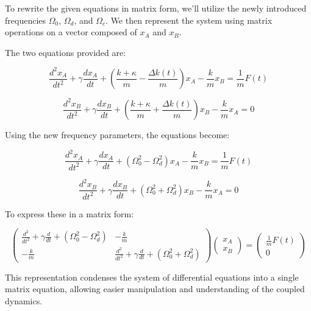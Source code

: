 \begin{airesult}
To rewrite the given equations in matrix form, we'll utilize the newly introduced frequencies
\(\Omega_0\), \(\Omega_d\), and \(\Omega_c\). We then represent the system using matrix operations
on a vector composed of \(x_A\) and \(x_B\).

The two equations provided are:

\vsp

\[
\frac{d^2x_A}{dt^2} + \gamma\frac{dx_A}{dt} + \left( \frac{k + \kappa}{m} - \frac{\Delta k(t)}{m}
\right)x_A
- \frac{k}{m}x_B = \frac{1}{m}F(t)
\]

\[
\frac{d^2x_B}{dt^2} + \gamma\frac{dx_B}{dt} + \left( \frac{k + \kappa}{m} + \frac{\Delta k(t)}{m}
\right)x_B
- \frac{k}{m}x_A = 0
\]

\vsp

Using the new frequency parameters, the equations become:

\vsp

\[
\frac{d^2x_A}{dt^2} + \gamma\frac{dx_A}{dt} + \left( \Omega_0^2 - \Omega_d^2 \right)x_A
- \frac{k}{m}x_B = \frac{1}{m}F(t)
\]

\[
\frac{d^2x_B}{dt^2} + \gamma\frac{dx_B}{dt} + \left( \Omega_0^2 + \Omega_d^2 \right)x_B
- \frac{k}{m}x_A = 0
\]

\vsp

To express these in a matrix form:

\[
\begin{pmatrix}
 \frac{d^2}{dt^2} + \gamma \frac{d}{dt} + (\Omega_0^2 - \Omega_d^2) & -\frac{k}{m} \\
 -\frac{k}{m} & \frac{d^2}{dt^2} + \gamma \frac{d}{dt} + (\Omega_0^2 + \Omega_d^2)
\end{pmatrix}
\begin{pmatrix}
 x_A \\
 x_B
\end{pmatrix}
=
\begin{pmatrix}
 \frac{1}{m}F(t) \\
 0
\end{pmatrix}
\]

\vsp

This representation condenses the system of differential equations into a single matrix equation,
allowing easier manipulation and understanding of the coupled dynamics.
\end{airesult}

